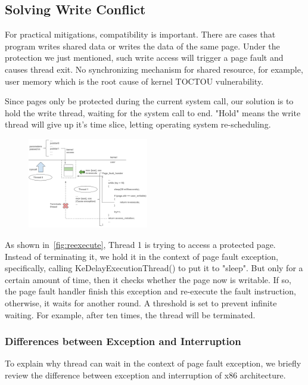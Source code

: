 \subsection{Solving Write Conflict }

For practical mitigations, compatibility is important. There are cases that program writes shared data or writes the data of the same page. Under the protection we just mentioned, such write access will trigger a page fault and causes thread exit. No synchronizing mechanism for shared resource, for example, user memory which is the root cause of kernel TOCTOU vulnerability. 

Since pages only be protected during the current system call, our solution is to hold the write thread, waiting for the system call to end. "Hold" means the write thread will give up it's time slice, letting operating system re-scheduling. 

\begin{figure}[th]
  \includegraphics[width=0.47\textwidth]{figures/reexecute}
  \centering
  \caption{}
  \label{fig:reexecute}
\end{figure}

As shown in~\autoref{fig:reexecute}, Thread 1 is trying to access a protected page. Instead of terminating it, we hold it in the context of page fault exception, specifically, calling KeDelayExecutionThread() to put it to "sleep". But only for a certain amount of time, then it checks whether the page now is writable. If so, the page fault handler finish this exception and re-execute the fault instruction, otherwise, it waits for another round. A threshold is set to prevent infinite waiting. For example, after ten times, the thread will be terminated.

\subsubsection{Differences between Exception and Interruption}

To explain why thread can wait in the context of page fault exception, we briefly review the difference between exception and interruption of x86 architecture.

